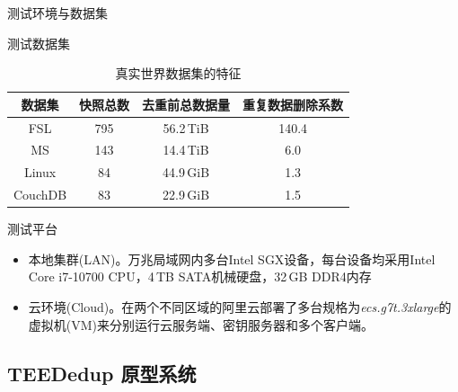 \documentclass{beamer}
\newcommand{\sysnameS}{TEEDedup }
\begin{document}
\begin{frame}{测试环境与数据集}
    \begin{textbox}{测试数据集}
        \vspace{-1em}
        \begin{table}[!htb]
            \small
            \centering
            \caption{真实世界数据集的特征}
            \label{tab:featurespy-datasets}
            \begin{tabular}{cccc}
                \toprule
                {\bf 数据集} & {\bf 快照总数} & {\bf 去重前总数据量} & {\bf 重复数据删除系数} \\
                \midrule
                FSL          & 795            & 56.2\,TiB            & 140.4                  \\
                MS           & 143            & 14.4\,TiB            & 6.0                    \\
                Linux        & 84             & 44.9\,GiB            & 1.3                    \\
                CouchDB      & 83             & 22.9\,GiB            & 1.5                    \\
                \bottomrule
            \end{tabular}
        \end{table}
    \end{textbox}

    \begin{textbox}{测试平台}
        \begin{itemize}
            \item 本地集群(LAN)。万兆局域网内多台Intel SGX设备，每台设备均采用Intel Core i7-10700 CPU，4\,TB SATA机械硬盘，32\,GB DDR4内存
            \item 云环境(Cloud)。在两个不同区域的阿里云部署了多台规格为\textit{ecs.g7t.3xlarge}的虚拟机(VM)来分别运行云服务端、密钥服务器和多个客户端。
        \end{itemize}
    \end{textbox}
\end{frame}

\subsection{\sysnameS 原型系统}
\end{document}
